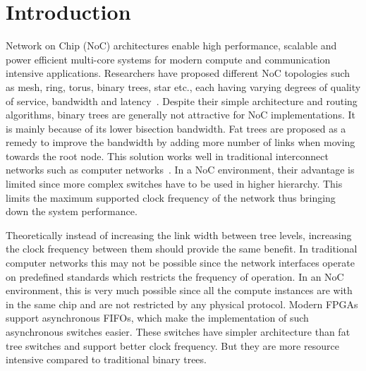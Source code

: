 \section{Introduction}
Network on Chip (NoC) architectures enable high performance, scalable and power efficient multi-core systems for modern compute and communication intensive applications.
Researchers have proposed different NoC topologies such as mesh, ring, torus, binary trees, star etc., each having varying degrees of quality of service, bandwidth and latency~\cite{Dally2003}.
Despite their simple architecture and routing algorithms, binary trees are generally not attractive for NoC implementations.
It is mainly because of its lower bisection bandwidth.
Fat trees are proposed as a remedy to improve the bandwidth by adding more number of links when moving towards the root node.
This solution works well in traditional interconnect networks such as computer networks~\cite{Shainer2011}.
In a NoC environment, their advantage is limited since more complex switches have to be used in higher hierarchy.
This limits the maximum supported clock frequency of the network thus bringing down the system performance. 

Theoretically instead of increasing the link width between tree levels, increasing the clock frequency between them should provide the same benefit.
In traditional computer networks this may not be possible since the network interfaces operate on predefined standards which restricts the frequency of operation.
In an NoC environment, this is very much possible since all the compute instances are with in the same chip and are not restricted by any physical protocol. 
Modern FPGAs support asynchronous FIFOs, which make the implementation of such asynchronous switches easier.
These switches have simpler architecture than fat tree switches and support better clock frequency.
But they are more resource intensive compared to traditional binary trees.

